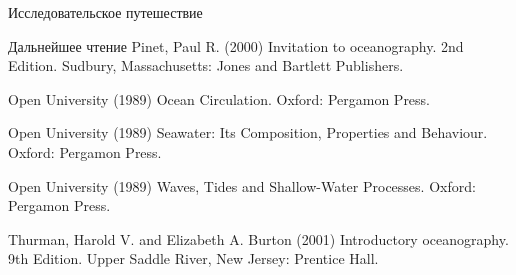 \begin{chapter}{Исследовательское путешествие}
\begin{section}{Дальнейшее чтение}
Pinet, Paul R. (2000) Invitation to oceanography. 2nd Edition. Sudbury, 
Massachusetts: Jones and Bartlett Publishers.

Open University (1989) Ocean Circulation. Oxford: Pergamon Press. 

Open University (1989) Seawater: Its Composition, Properties and Behaviour. 
Oxford: Pergamon Press. 

Open University (1989) Waves, Tides and Shallow-Water Processes. 
Oxford: Pergamon Press. 

Thurman, Harold V. and Elizabeth A. Burton (2001) Introductory oceanography. 
9th Edition. Upper Saddle River, New Jersey: Prentice Hall.
\end{section}

\end{chapter}